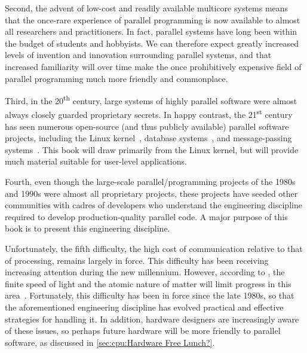 Second, the advent of low-cost and readily available multicore systems
means that the once-rare experience of parallel programming is
now available to almost all researchers and practitioners.
In fact, parallel systems have long been within the budget of students
and hobbyists.
We can therefore expect greatly increased levels of invention and
innovation surrounding parallel systems, and that increased familiarity
will over time make the once prohibitively expensive field of parallel
programming much more friendly and commonplace.

Third, in the 20\textsuperscript{th} century, large systems of
highly parallel software were almost always closely guarded proprietary
secrets.
In happy contrast, the 21\textsuperscript{st} century has seen numerous
open-source (and thus publicly available) parallel software projects,
including the Linux kernel~\cite{Torvalds2.6kernel},
database systems~\cite{PostgreSQL2008,MySQL2008},
and message-passing systems~\cite{OpenMPI2008,BOINC2008}.
This book will draw primarily from the Linux kernel, but will
provide much material suitable for user-level applications.

Fourth, even though the large-scale parallel\-/programming projects of
the 1980s and 1990s were almost all proprietary projects, these
projects have seeded other communities with cadres of developers who
understand the engineering discipline required to develop production-quality
parallel code.
A major purpose of this book is to present this engineering discipline.

Unfortunately, the fifth difficulty, the high cost of communication
relative to that of processing, remains largely in force.
This difficulty has been receiving increasing attention during
the new millennium.
However, according to ,
the finite speed of light and the atomic
nature of matter will limit progress in this
area~\cite{BryanGardiner2007,GordonMoore03a}.
Fortunately, this difficulty has been in force since the late 1980s,
so that the aforementioned engineering discipline has evolved practical
and effective strategies for handling it.
In addition, hardware designers are increasingly aware of these issues,
so perhaps future hardware will be more friendly to parallel software,
as discussed in \cref{sec:cpu:Hardware Free Lunch?}.

